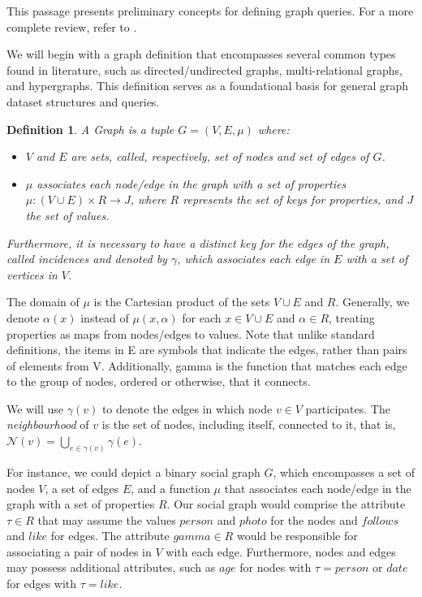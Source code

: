 \documentclass[mathematics,article,submit,pdftex,moreauthors]{Definitions/mdpi}
\newtheorem{definition}{Definition}[section]
\begin{document}
This passage presents preliminary concepts for defining graph queries. For a more complete review, refer to \citep{DBLP:journals/corr/abs-1708-03734}.  

We will begin with a graph definition that encompasses several common types found in literature, such as directed/undirected graphs, multi-relational graphs, and hypergraphs. This definition serves as a foundational basis for general graph dataset structures and queries.

\begin{definition}
A \emph{Graph} is a tuple $ G = (V, E, \mu) $ where:
\begin{itemize}
\item $ V $ and $ E $ are sets, called, respectively, \emph{set of nodes} and \emph{set of edges} of $ G $.
\item $ \mu $ associates each node/edge in the graph with a set of properties $ \mu: (V \cup E) \times R \rightarrow J $, where $ R $ represents the set of \emph{keys} for  properties, and $ J $ the set of \emph{values}. 
\end{itemize} 

Furthermore, it is necessary to have a distinct key for the edges of the graph, called \emph{incidences} and denoted by $\gamma $, which associates each edge in $E$ with a set of vertices in $V$.
\end{definition}
\medskip
The domain of $ \mu $ is the Cartesian product of the sets $V \cup E$ and $ R $. Generally, we denote $\alpha(x)$ instead of $\mu(x,\alpha)$ for each $x\in V\cup E$ and $\alpha \in R$, treating properties as maps from nodes/edges to values. Note that unlike standard definitions, the items in E are symbols that indicate the edges, rather than pairs of elements from V. Additionally, gamma is the function that matches each edge to the group of nodes, ordered or otherwise, that it connects. 

We will use $\gamma(v)$ to denote the edges in which node $v\in V$ participates. The \emph{neighbourhood} of $ v $ is the set of nodes, including itself, connected to it, that is, $ \mathcal{N}(v) = \bigcup_{e \in \gamma (v)} \gamma (e) $. 

For instance, we could depict a binary social graph $G$, which encompasses a set of nodes $V$, a set of edges $E$, and a function $\mu$ that associates each node/edge in the graph with a set of properties $R$. Our social graph would comprise the attribute $\tau \in R$ that may assume the values $person$ and $photo$ for the nodes and $follows$ and $like$ for edges. The attribute $gamma \in R$ would be responsible for associating a pair of nodes in $V$ with each edge. Furthermore, nodes and edges may possess additional attributes, such as $age$ for nodes with $\tau = person$ or $date$ for edges with $\tau = like$.
\end{document}
